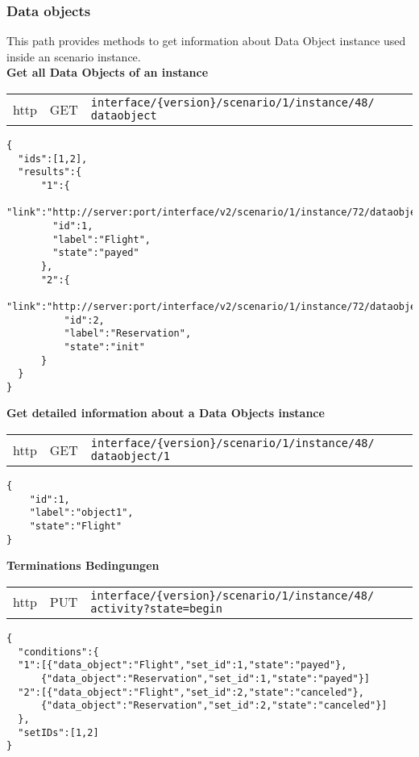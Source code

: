    \subsubsection{Data objects}
    
    This path provides methods to get information about Data Object instance used inside an scenario instance.\\
    \textbf{Get all Data Objects of an instance}\\
        	\begin{tabular}{lll}
        		http & GET & \texttt{interface/\{version\}/scenario/1/instance/48/
        		                                              dataobject}
        	\end{tabular}
		\begin{flushleft}
			\begin{lstlisting}
{
  "ids":[1,2],
  "results":{
      "1":{
        "link":"http://server:port/interface/v2/scenario/1/instance/72/dataobject/1",
        "id":1,
        "label":"Flight",
        "state":"payed"
      },
      "2":{
          "link":"http://server:port/interface/v2/scenario/1/instance/72/dataobject/2",
          "id":2,
          "label":"Reservation",
          "state":"init"
      }
  }
}
		\end{lstlisting}
       \end{flushleft}
    \textbf{Get detailed information about a Data Objects instance}\\
        	\begin{tabular}{lll}
        		http & GET & \texttt{interface/\{version\}/scenario/1/instance/48/
        		                                              dataobject/1}
        	\end{tabular}
		\begin{flushleft}
			\begin{lstlisting}
{
    "id":1,
    "label":"object1",
    "state":"Flight"
}
		\end{lstlisting}
       \end{flushleft}
       
    \textbf{Terminations Bedingungen}\\
			\begin{tabular}{lll}
				http & PUT & \texttt{interface/\{version\}/scenario/1/instance/48/
				                                              activity?state=begin}
			\end{tabular}
		\begin{flushleft}
			\begin{lstlisting}
{
  "conditions":{
  "1":[{"data_object":"Flight","set_id":1,"state":"payed"},
      {"data_object":"Reservation","set_id":1,"state":"payed"}]
  "2":[{"data_object":"Flight","set_id":2,"state":"canceled"},
      {"data_object":"Reservation","set_id":2,"state":"canceled"}]
  },
  "setIDs":[1,2]
}
		\end{lstlisting}
       \end{flushleft}
       
